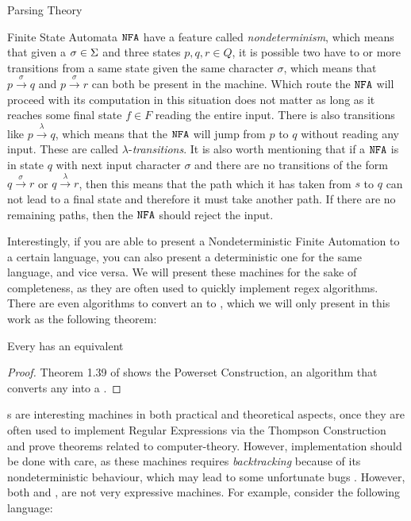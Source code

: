 \begin{section}{Parsing Theory}
\begin{subsection}{Finite State Automata}
$\texttt{NFA}$ have a feature called \textit{nondeterminism}, which means that given
a $\sigma \in \Sigma$ and three states $p, q, r \in Q$, it is possible
two have to or more transitions from a same state given the same character $\sigma$, which
means that $p \overset{\sigma}{\longrightarrow} q$ and
$p \overset{\sigma}{\longrightarrow} r$ can both be present in the machine. Which route the $\texttt{NFA}$ will proceed with
its computation in this situation does not matter as long as it reaches some final
state $f \in F$ reading the entire input. There is also transitions like
$p \overset{\lambda}{\longrightarrow} q$, which means that the $\texttt{NFA}$ will 
jump from $p$ to $q$ without reading any input. These are called
$\lambda$-\textit{transitions}. It is also worth mentioning that if a $\texttt{NFA}$
is in state $q$ with next input character $\sigma$ and there are no transitions
of the form $q \overset{\sigma}{\longrightarrow} r$ or
$q \overset{\lambda}{\longrightarrow} r$, then this means that the path which
it has taken from $s$ to $q$ can not lead to a final state and therefore it must
take another path. If there are no remaining paths, then the $\texttt{NFA}$ should
reject the input.


Interestingly, if you are able to present a Nondeterministic Finite Automation to a
certain language, you can also present a deterministic one for the same
language, and vice versa. We will present these machines for the sake
of completeness, as they are often used to quickly implement regex
algorithms. There are even algorithms to convert an  to
, which we will only present in this work as the following
theorem:

\begin{theorem}\label{nfa_to_dfa}
Every  has an equivalent 
\end{theorem}
\begin{proof}
	Theorem 1.39 of \citep{sipser2012} shows the Powerset Construction, an algorithm
	that converts any  into a .
\end{proof}

s are interesting machines in both practical and theoretical aspects,
once they are often used to implement Regular Expressions via the Thompson
Construction \citep{dragonbook} and prove theorems related to computer-theory.
However, implementation should be done with care, as these machines requires
\textit{backtracking} because of its nondeterministic behaviour, which may lead
to some unfortunate bugs \citep{PR86164}. However, both \DFA and \NFA, are not
very expressive machines. For example, consider the following language:


\end{subsection}
\end{section}
